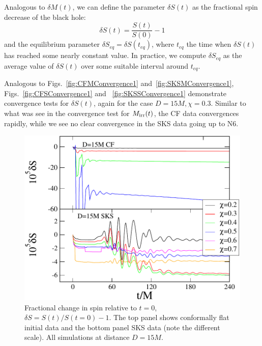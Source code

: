 Analogous to $\delta M(t)$, we can define the parameter $\delta S(t)$ as the
fractional spin decrease of the black hole:
\begin{equation}
\delta S(t)=\frac{S(t)}{S(0)} - 1
\end{equation}
and the equilibrium parameter $\delta S_{eq}=\delta S(t_{eq})$, where $t_{eq}$ the
time when $\delta S(t)$ has reached some nearly constant value.
In practice, we compute $\delta S_{eq}$ as the average value of
$\delta S(t)$
over some suitable interval around $t_{eq}$.

Analogous to Figs.~\ref{fig:CFMConvergence1}
and~\ref{fig:SKSMConvergence1}, Figs.~\ref{fig:CFSConvergence1} and
~\ref{fig:SKSSConvergence1} demonstrate convergence tests for $\delta
S(t)$, again for the case $D=15M, \chi=0.3$. Similar to what was see
in the convergence test for $M_{\rm irr}(t)$, the CF data convergences
rapidly, while we see no clear convergence in the SKS data going up to N6.

\begin{figure}
\includegraphics[width=0.95\columnwidth]{chap5/SvsT2}
\caption[$\delta S(t)$ for CF and SKS initial data.]{Fractional change in spin relative to $t=0$, $\delta S = S(t)/S(t=0)-1$.  The top panel shows conformally flat initial data and the bottom panel SKS data (note the different scale).  All simulations at distance $D=15M$.}
\label{fig:SvsT2}
\end{figure}


